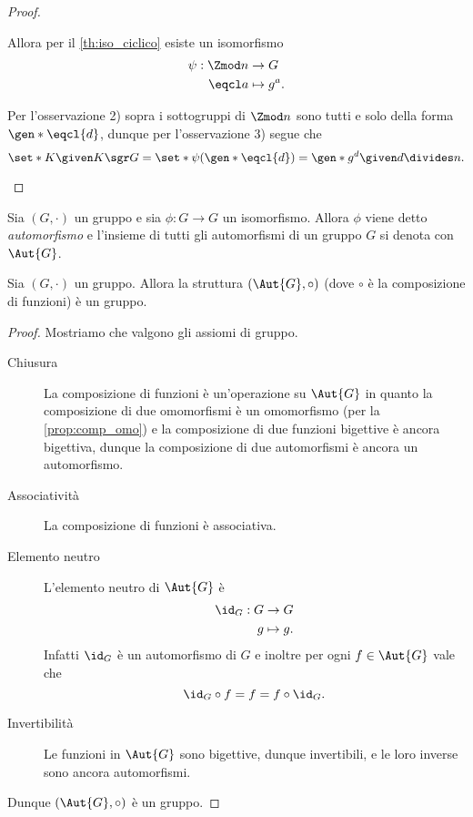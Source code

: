 \begin{proof}
\begin{enumerate}[label={(\roman*)}]
        Allora per il \autoref{th:iso_ciclico} esiste un isomorfismo \begin{align*}
            \psi : \Zmod n &\to G\\
            \eqcl a &\mapsto g^a.
        \end{align*}

        Per l'osservazione 2) sopra i sottogruppi di $\Zmod n$ sono tutti e solo della forma $\displaystyle \gen*{\eqcl{d}}$, dunque per l'osservazione 3) segue che \[
            \set*{K \given K \sgr G} = \set*{
                \psi(\gen*{\eqcl{d}}) 
            = \gen*{g^{d}} \given d \divides n}. \qedhere   
        \] 
    \end{enumerate}
\end{proof}

\begin{definition}[Automorfismo]
    Sia $(G, \cdot)$ un gruppo e sia $\phi : G \to G$ un isomorfismo. Allora $\phi$ viene detto \emph{automorfismo} e l'insieme di tutti gli automorfismi di un gruppo $G$ si denota con $\Aut{G}$.
\end{definition}

\begin{proposition}
    Sia $(G, \cdot)$ un gruppo. Allora la struttura $(\Aut{G}, \circ)$ (dove $\circ$ è la composizione di funzioni) è un gruppo.
\end{proposition}
\begin{proof}
    Mostriamo che valgono gli assiomi di gruppo.
    \begin{description}
        \item[Chiusura] La composizione di funzioni è un'operazione su $\Aut{G}$ in quanto la composizione di due omomorfismi è un omomorfismo (per la \autoref{prop:comp_omo}) e la composizione di due funzioni bigettive è ancora bigettiva, dunque la composizione di due automorfismi è ancora un automorfismo.
        \item[Associatività] La composizione di funzioni è associativa.
        \item[Elemento neutro] L'elemento neutro di $\Aut{G}$ è \begin{align*}
            \id_G : G &\to G \\
            g &\mapsto g.
        \end{align*}  Infatti $\id_G$ è un automorfismo di $G$ e inoltre per ogni $f \in \Aut{G}$ vale che\[
            \id_G \circ{} f = f = f \circ \id_G.
        \]
        \item[Invertibilità] Le funzioni in $\Aut{G}$ sono bigettive, dunque invertibili, e le loro inverse sono ancora automorfismi.
    \end{description}
    Dunque $(\Aut{G}, \circ)$ è un gruppo.
\end{proof}

